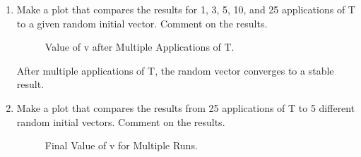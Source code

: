 \documentclass[fleqn]{article}
\begin{document}
\begin{enumerate}[nolistsep]
\begin{enumerate}
				\item Make a plot that compares the results for 1, 3, 5, 10, and 25 applications of T to a given random initial vector. Comment on the results.
				
					\begin{figure}[H]				
							\centerline{}
							\caption{Value of v after Multiple Applications of T.}
							\label{multiple_apps_of_T}
					\end{figure}
				
					After multiple applications of T, the random vector converges to a stable result.
					
					
				\item Make a plot that compares the results from 25 applications of T to 5 different random initial vectors. Comment on the results.
				
					\begin{figure}[H]				
							\centerline{}
							\caption{Final Value of v for Multiple Runs.}
							\label{final_value_multiple_runs}
					\end{figure}
					

\end{enumerate}
\end{enumerate}
\end{document}
